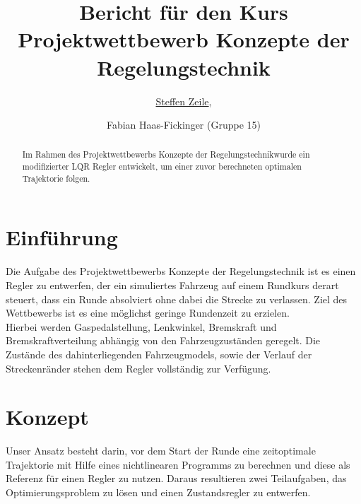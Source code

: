 \documentclass[pdf]{ifacconf}
\begin{document}
\begin{frontmatter}

\title{Bericht für den Kurs \glqq Projektwettbewerb Konzepte der Regelungstechnik\grqq}


\author{\underline{Steffen Zeile},} 
\author{Fabian Haas-Fickinger (Gruppe 15)} 

\begin{abstract}                          %
Im Rahmen des \glqq Projektwettbewerbs Konzepte der Regelungstechnik\grqq  wurde ein modifizierter LQR Regler entwickelt, um einer zuvor berechneten optimalen Trajektorie folgen.\end{abstract}

\end{frontmatter}

\section{Einführung}
Die Aufgabe des Projektwettbewerbs Konzepte der Regelungstechnik ist es einen Regler zu entwerfen, der ein simuliertes Fahrzeug auf einem Rundkurs derart steuert, dass ein Runde absolviert ohne dabei die Strecke zu verlassen. Ziel des Wettbewerbs ist es eine möglichst geringe Rundenzeit zu erzielen.\\
Hierbei werden Gaspedalstellung, Lenkwinkel, Bremskraft und Bremskraftverteilung abhängig von den Fahrzeugzuständen geregelt. Die Zustände des dahinterliegenden Fahrzeugmodels, sowie der Verlauf der Streckenränder stehen dem Regler vollständig zur Verfügung.

\section{Konzept}
Unser Ansatz besteht darin, vor dem Start der Runde eine zeitoptimale Trajektorie mit Hilfe eines nichtlinearen Programms zu berechnen und diese als Referenz für einen Regler zu nutzen. Daraus resultieren zwei Teilaufgaben, das Optimierungsproblem zu lösen und einen Zustandsregler zu entwerfen.
\end{document}

